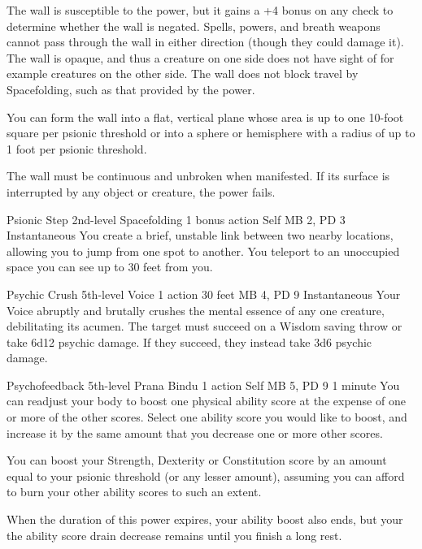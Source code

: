 The wall is susceptible to the  power,
but it gains a +4 bonus on any check
to determine whether the wall is negated.
Spells, powers, and breath weapons cannot pass through the wall
in either direction
(though they could damage it).
The wall is opaque, and thus a creature on one side does not have
sight of for example creatures on the other side.
The wall does not block travel by Spacefolding,
such as that provided by the  power.
  
You can form the wall into a flat, vertical plane
whose area is up to one 10-foot square per psionic threshold
or into a sphere or hemisphere
with a radius of up to 1 foot per psionic threshold.
  
The wall must be continuous and unbroken when manifested.
If its surface is interrupted by any object or creature,
the power fails.

\DndPowerHeader%
  {Psionic Step}
  {2nd-level Spacefolding}
  {1 bonus action}
  {Self}
  {MB 2, PD 3}
  {Instantaneous}
You create a brief, unstable link between two nearby locations,
allowing you to jump from one spot to another.
You teleport to an unoccupied space you can see
up to 30 feet from you.

\DndPowerHeader%
  {Psychic Crush}
  {5th-level Voice}
  {1 action}
  {30 feet}
  {MB 4, PD 9}
  {Instantaneous}
Your Voice abruptly and brutally crushes the mental essence
of any one creature, debilitating its acumen.
The target must succeed on a Wisdom saving throw
or take 6d12 psychic damage.
If they succeed, they instead take 3d6 psychic damage.

\DndPowerHeader%
  {Psychofeedback}
  {5th-level Prana Bindu}
  {1 action}
  {Self}
  {MB 5, PD 9}
  {1 minute}
  You can readjust your body to boost one
  physical ability score at the expense of one
  or more of the other scores.
  Select one ability score you would like to boost,
  and increase it by the same amount that you decrease
  one or more other scores.

  You can boost your
  Strength, Dexterity or Constitution score by an
  amount equal to your psionic threshold
  (or any lesser amount),
  assuming you can afford to burn your other ability
  scores to such an extent.
  
  When the duration of this power expires,
  your ability boost also ends,
  but your the ability score drain decrease
  remains until you finish a long rest.

